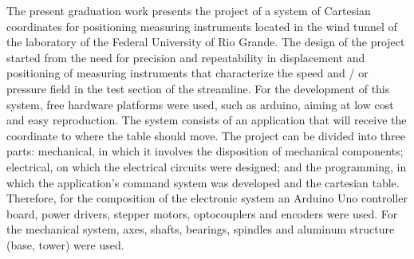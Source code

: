 The present graduation work presents the project of a system of Cartesian coordinates 
for positioning measuring instruments located in the wind tunnel of the laboratory 
of the Federal University of Rio Grande. The design of the project started from the 
need for precision and repeatability in displacement and positioning of measuring 
instruments that characterize the speed and / or pressure field in the test section 
of the streamline. For the development of this system, free hardware platforms were 
used, such as arduino, aiming at low cost and easy reproduction. The system consists 
of an application that will receive the coordinate to where the table should move. 
The project can be divided into three parts: mechanical, in which it involves the 
disposition of mechanical components; electrical, on which the electrical circuits 
were designed; and the programming, in which the application's command system was 
developed and the cartesian table. Therefore, for the composition of the electronic 
system an Arduino Uno controller board, power drivers, stepper motors, optocouplers 
and encoders were used. For the mechanical system, axes, shafts, bearings, spindles 
and aluminum structure (base, tower) were used.

